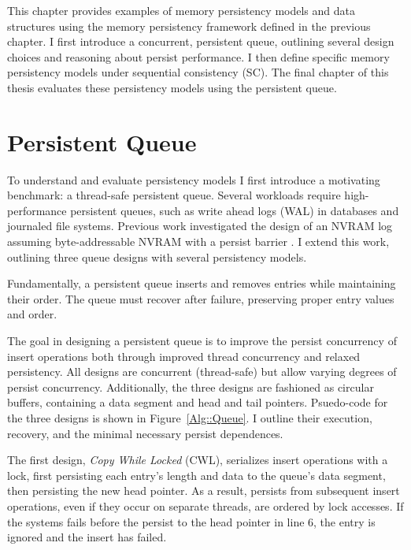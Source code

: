 This chapter provides examples of memory persistency models and data structures using the memory persistency framework defined in the previous chapter.
I first introduce a concurrent, persistent queue, outlining several design choices and reasoning about persist performance.
I then define specific memory persistency models under sequential consistency (SC).
The final chapter of this thesis evaluates these persistency models using the persistent queue.

\section{Persistent Queue}
\label{sec:PersistencyModels:Queue}

To understand and evaluate persistency models I first introduce a motivating benchmark: a thread-safe persistent queue.
Several workloads require high-performance persistent queues, such as write ahead logs (WAL) in databases and journaled file systems.
Previous work investigated the design of an NVRAM log assuming byte-addressable NVRAM with a persist barrier \cite{FangHsiao11}.
I extend this work, outlining three queue designs with several persistency models.

Fundamentally, a persistent queue inserts and removes entries while maintaining their order.
The queue must recover after failure, preserving proper entry values and order.

The goal in designing a persistent queue is to improve the persist concurrency of insert operations both through improved thread concurrency and relaxed persistency.
All designs are concurrent (thread-safe) but allow varying degrees of persist concurrency.
Additionally, the three designs are fashioned as circular buffers, containing a data segment and head and tail pointers.
Psuedo-code for the three designs is shown in Figure~\ref{Alg::Queue}.
I outline their execution, recovery, and the minimal necessary persist dependences.



The first design, \emph{Copy While Locked} (CWL), serializes insert operations with a lock, first persisting each entry's length and data to the queue's data segment, then persisting the new head pointer.
As a result, persists from subsequent insert operations, even if they occur on separate threads, are ordered by lock accesses.
If the systems fails before the persist to the head pointer in line 6, the entry is ignored and the insert has failed.

